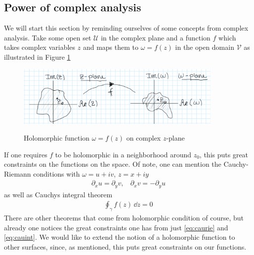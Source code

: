 \documentclass[lettersize,12pt]{article}
\begin{document}
\subsection{Power of complex analysis}
We will start this section by reminding ourselves of some concepts from complex analysis.
Take some open set $\mathcal{U}$ in the complex plane and a function $f$ which takes complex variables $z$ and maps them to $\omega=f(z)$ in the open domain $\mathcal{V}$ as illustrated in Figure \ref{fig:complan}
\begin{figure}[H] \centering
\includegraphics[width=10cm]{1.PNG} \label{fig:complan} \caption{Holomorphic function $\omega=f(z)$ on complex $z$-plane }
\end{figure}
If one requires $f$ to be holomorphic in a neighborhood around $z_0$, this puts great constraints on the functions on the space. Of note, one can mention the Cauchy-Riemann conditions \cite{Goldbart} with $\omega=u+iv$, $z=x+iy$
\begin{equation} \label{eq:caurie}
	\begin{aligned}
		\partial_x u= \partial_y v,~~~~\partial_x v= -\partial_y u
	\end{aligned}
\end{equation}
as well as Cauchys integral theorem
\begin{equation}
	\begin{aligned} \label{eq:cauint}
		\oint_\gamma f(z)\,\dd z=0
	\end{aligned}
\end{equation}
There are other theorems that come from holomorphic condition of course, but already one notices the great constraints one has from just \eqref{eq:caurie} and \eqref{eq:cauint}. We would like to extend the notion of a holomorphic function to other surfaces, since, as mentioned, this puts great constraints on our functions.
\end{document}
